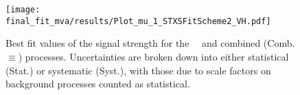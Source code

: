 \begin{figure}[hb]
	\centering
	\texttt{[image: final\_fit\_mva/results/Plot\_mu\_1\_STXSFitScheme2\_VH.pdf]}
  \caption{Best fit values of the signal strength for the \WH\, \ZH\ and
    combined (Comb.$\equiv$\VH) processes. Uncertainties are broken down into
    either statistical (Stat.) or systematic (Syst.), with those due to scale
    factors on background processes counted as statistical.}
  \label{fig:WZH-mus}
\end{figure}